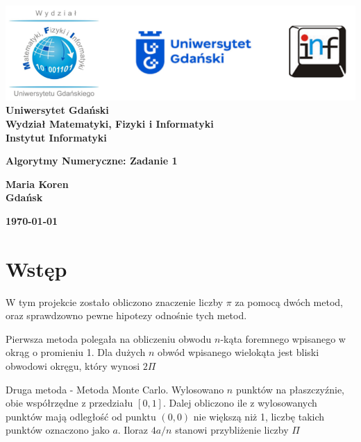 \documentclass[12pt,a4paper]{article}
\newcommand{\hmwkTitle}{Algorytmy Numeryczne: Zadanie 1}
\newcommand{\hmwkDueDate}{\today}
\newcommand{\hmwkAuthorName}{Maria Koren}
\begin{document}
\begin{titlepage}
    \vfill
	\begin{center}
	\hspace*{-1cm}
	\vspace*{0.5cm}
    \includegraphics[scale=0.55]{images/loga.png}\\
	\textbf{Uniwersytet Gdański \\ [0.05cm]Wydział Matematyki, Fizyki i Informatyki \\ [0.05cm] Instytut Informatyki}

	\vspace{0.6cm}
	\vspace{4cm}
	{\huge \textbf{\hmwkTitle}}\vspace{8mm}
	
	{\large \textbf{\hmwkAuthorName}}\\[3cm]
	

	  \vfill
	\textbf{Gdańsk}
	
	\textbf{\hmwkDueDate}
	\end{center}
	
\end{titlepage}

\newpage
\tableofcontents{}
\newpage

\section{Wstęp}


W tym projekcie zostało obliczono znaczenie liczby $\pi$ za pomocą dwóch metod, oraz sprawdzowno pewne hipotezy odnośnie tych metod.

Pierwsza metoda polegała na obliczeniu obwodu $n$-kąta foremnego wpisanego w okrąg o promieniu 1. Dla dużych $n$ obwód wpisanego wielokąta jest bliski obwodowi okręgu, który wynosi $2\Pi$

Druga metoda - Metoda Monte Carlo. Wylosowano $n$ punktów na płaszczyźnie, obie współrzędne z przedziału $[0, 1]$. Dalej obliczono ile z wylosowanych punktów mają odległość od punktu $(0, 0)$ nie większą niż 1, liczbę takich punktów oznaczono jako $a$. Iloraz $4a/n$ stanowi przybliżenie liczby $\Pi$
\end{document}
